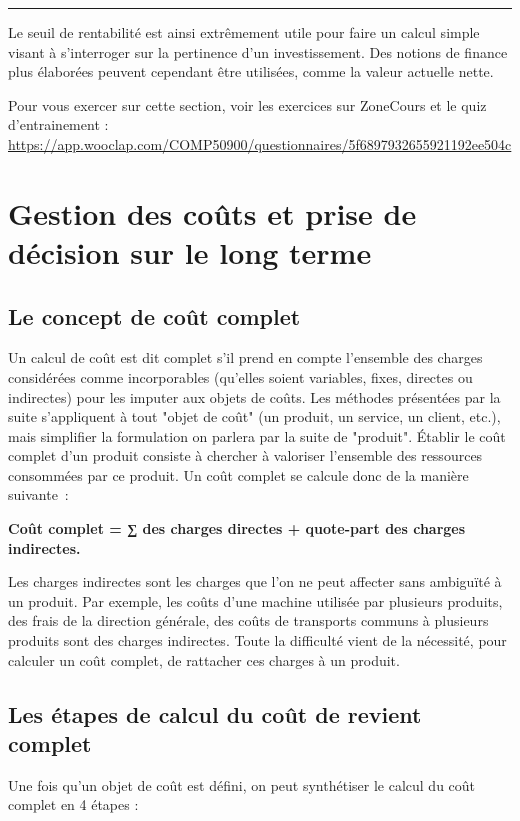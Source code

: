 \documentclass[oneside]{kaobook}
\begin{document}
\noindent\rule{\textwidth}{0.5pt}

Le seuil de rentabilité est ainsi extrêmement utile pour faire un calcul simple visant à s'interroger sur la pertinence d'un investissement. Des notions de finance plus élaborées peuvent cependant être utilisées, comme la valeur actuelle nette.

\begin{kaobox}
Pour vous exercer sur cette section, voir les exercices sur ZoneCours et le quiz d'entrainement : \url{https://app.wooclap.com/COMP50900/questionnaires/5f6897932655921192ee504c}
\end{kaobox}

\chapter{Gestion des coûts et prise de décision sur le long terme}
\label{sec:orgbf3d354}
\section{Le concept de coût complet}
\label{sec:org5eef73b}

Un calcul de coût est dit complet s'il prend en compte l'ensemble des charges considérées comme incorporables (qu'elles soient variables, fixes, directes ou indirectes) pour les imputer aux objets de coûts. Les méthodes présentées par la suite s'appliquent à tout "objet de coût" (un produit, un service, un client, etc.), mais simplifier la formulation on parlera par la suite de "produit". 
Établir le coût complet d'un produit consiste à chercher à valoriser l'ensemble des ressources consommées par ce produit. Un coût complet se calcule donc de la manière suivante :
\begin{center}
\textbf{Coût complet = ∑ des charges directes + quote-part des charges indirectes.}
\end{center}
Les charges indirectes sont les charges que l'on ne peut affecter sans ambiguïté à un produit. Par exemple, les coûts d'une machine utilisée par plusieurs produits, des frais de la direction générale, des coûts de transports communs à plusieurs produits sont des charges indirectes. Toute la difficulté vient de la nécessité, pour calculer un coût complet, de rattacher ces charges à un produit.
\section{Les étapes de calcul du coût de revient complet}
\label{sec:orga1419cf}
Une fois qu'un objet de coût est défini, on peut synthétiser le calcul du coût complet en 4 étapes :
\end{document}
